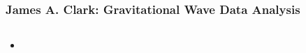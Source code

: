 \documentclass{beamer}
\begin{document}
\begin{frame}
    \frametitle{James A. Clark: Gravitational Wave Data Analysis}

    \begin{columns}[]
        \begin{center}

            \begin{small}
                \begin{itemize}
                    \item 
                \end{itemize}
            \end{small}

    \begin{center}
        \vspace{-0.75cm}
        \begin{figure}
             \\
        \end{figure}
    \end{center}

    \end{center}




\end{columns}
\end{frame}
\end{document}
